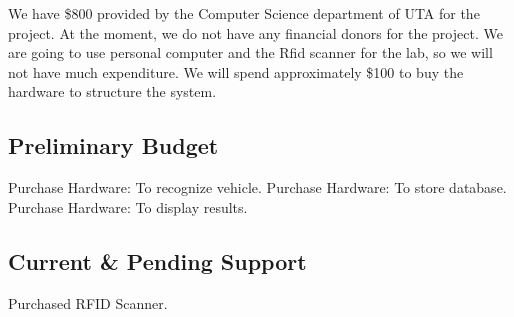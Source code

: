 \quad \quad We have \$800 provided by the Computer Science department of UTA for the project. At the moment, we do not have any financial donors for the project. We are going to use personal computer and the Rfid scanner for the lab, so we will not have much expenditure. We will spend approximately \$100 to buy the hardware to structure the system.

\subsection{Preliminary Budget}
\quad \quad Purchase Hardware: To recognize vehicle.
Purchase Hardware: To store database.
Purchase Hardware: To display results.

\subsection{Current \& Pending Support}
\quad \quad Purchased RFID Scanner.